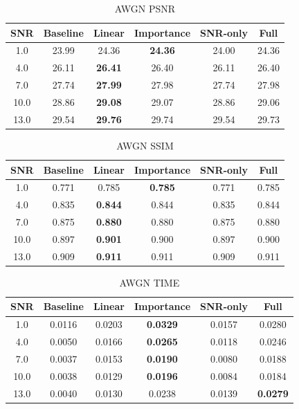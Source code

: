\begin{table}[h]
\centering
\caption{AWGN PSNR}
\begin{tabular}{c|ccccc}
\hline
SNR & Baseline & Linear & Importance & SNR-only & Full \\ \hline
1.0 & 23.99 & 24.36 & \textbf{24.36} & 24.00 & 24.36 \\
4.0 & 26.11 & \textbf{26.41} & 26.40 & 26.11 & 26.40 \\
7.0 & 27.74 & \textbf{27.99} & 27.98 & 27.74 & 27.98 \\
10.0 & 28.86 & \textbf{29.08} & 29.07 & 28.86 & 29.06 \\
13.0 & 29.54 & \textbf{29.76} & 29.74 & 29.54 & 29.73 \\
\hline
\end{tabular}
\end{table}

\begin{table}[h]
\centering
\caption{AWGN SSIM}
\begin{tabular}{c|ccccc}
\hline
SNR & Baseline & Linear & Importance & SNR-only & Full \\ \hline
1.0 & 0.771 & 0.785 & \textbf{0.785} & 0.771 & 0.785 \\
4.0 & 0.835 & \textbf{0.844} & 0.844 & 0.835 & 0.844 \\
7.0 & 0.875 & \textbf{0.880} & 0.880 & 0.875 & 0.880 \\
10.0 & 0.897 & \textbf{0.901} & 0.900 & 0.897 & 0.900 \\
13.0 & 0.909 & \textbf{0.911} & 0.911 & 0.909 & 0.911 \\
\hline
\end{tabular}
\end{table}

\begin{table}[h]
\centering
\caption{AWGN TIME}
\begin{tabular}{c|ccccc}
\hline
SNR & Baseline & Linear & Importance & SNR-only & Full \\ \hline
1.0 & 0.0116 & 0.0203 & \textbf{0.0329} & 0.0157 & 0.0280 \\
4.0 & 0.0050 & 0.0166 & \textbf{0.0265} & 0.0118 & 0.0246 \\
7.0 & 0.0037 & 0.0153 & \textbf{0.0190} & 0.0080 & 0.0188 \\
10.0 & 0.0038 & 0.0129 & \textbf{0.0196} & 0.0084 & 0.0184 \\
13.0 & 0.0040 & 0.0130 & 0.0238 & 0.0139 & \textbf{0.0279} \\
\hline
\end{tabular}
\end{table}

